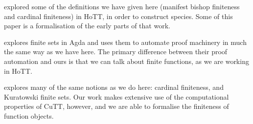 \cite{yorgeyCombinatorialSpeciesLabelled2014} explored some of the definitions
we have given here (manifest bishop finiteness and cardinal finiteness) in HoTT,
in order to construct species.
Some of this paper is a formalisation of the early parts of that work.

\cite{firsovDependentlyTypedProgramming2015} explores finite sets in Agda and
uses them to automate proof machinery in much the same way as we have here.
The primary difference between their proof automation and ours is that we can
talk about finite functions, as we are working in HoTT.

\cite{fruminFiniteSetsHomotopy2018} explores many of the same notions as we do
here: cardinal finiteness, and Kuratowski finite sets.
Our work makes extensive use of the computational properties of CuTT, however,
and we are able to formalise the finiteness of function objects.


